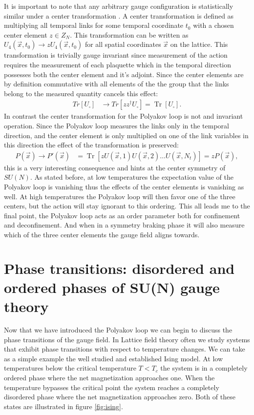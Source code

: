 \documentclass[english,twoside,openright]{UH_TCM_MSc}
\DeclareMathOperator{\Tr}{Tr}
\begin{document}
It is important to note that any arbitrary gauge configuration is statistically similar under a center transformation \cite[ch. 12.1.1]{gattringer2009quantum}. A center transformation is defined as multiplying all temporal links for some temporal coordinate $t_0$ with a chosen center element $z \in Z_N$. This transformation can be written as $U_4(\Vec{x},t_0) \rightarrow zU_4(\Vec{x},t_0)$ for all spatial coordinates $\Vec{x}$ on the lattice. This transformation is trivially gauge invariant since measurement of the action requires the measurement of each plaquette which in the temporal direction possesses both the center element and it's adjoint. Since the center elements are by definition commutative with all elements of the the group that the links belong to the measured quantity cancels this effect:
\begin{align}
    Tr[U_{\square}] &\rightarrow Tr[z z^\dagger U_{\square}] = \Tr[U_\square].
\end{align}
In contrast the center transformation for the Polyakov loop is not and invariant operation. Since the Polyakov loop measures the links only in the temporal direction, and the center element is only multiplied on one of the link variables in this direction the effect of the transformation is preserved:
\begin{align}
    P(\Vec{x}) \rightarrow P'(\Vec{x}) &= \Tr[z U(\Vec{x},1) U(\Vec{x},2) \hdots U(\Vec{x},N_t)] = z P(\Vec{x}),
\end{align}
this is a very interesting consequence and hints at the center symmetry of $SU(N)$. As stated before, at low temperatures the expectation value of the Polyakov loop is vanishing thus the effects of the center elements is vanishing as well. At high temperatures the Polyakov loop will then favor one of the three centers, but the action will stay ignorant to this ordering. This all leads me to the final point, the Polyakov loop acts as an order parameter both for confinement and deconfinement. And when in a symmetry braking phase it will also measure which of the three center elements the gauge field aligns towards. 

\section{Phase transitions: disordered and ordered phases of SU(N) gauge theory} \label{sec:phase_transition}

Now that we have introduced the Polyakov loop we can begin to discuss the phase transitions of the gauge field. In Lattice field theory often we study systems that exhibit  phase transitions with respect to temperature changes. We can take as a simple example the well studied and established Ising model. At low temperatures below the critical temperature $T < T_c$ the system is in a completely ordered phase where the net magnetization approaches one. When the temperature bypasses the critical point the system reaches a completely disordered phase where the net magnetization approaches zero. Both of these states are illustrated in figure \ref{fig:ising}. 
\end{document}
